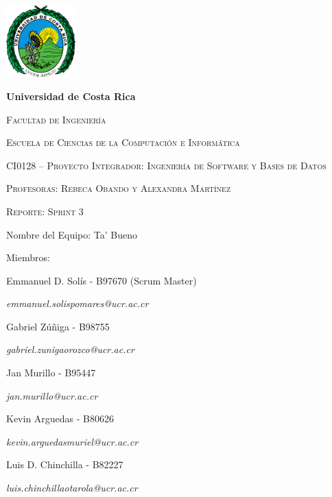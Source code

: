 \documentclass{article}
\begin{document}
\begin{titlepage}
\centering
{\includegraphics[width=0.2\textwidth]{logoUCR.png}\par}
\vspace{1cm}
{\bfseries\LARGE Universidad de Costa Rica \par}
\vspace{1cm}
{\scshape\Large Facultad de Ingenier\'ia \par}
{\scshape\Large Escuela de Ciencias de la Computaci\'on e Inform\'atica \par}
\vspace{1cm}
{\scshape\Large CI0128 – Proyecto Integrador: Ingeniería de Software y Bases de Datos \par}
{\scshape\Large Profesoras: Rebeca Obando y Alexandra Martínez \par}
\vspace{1cm}
{\scshape\Huge Reporte: Sprint 3 \par}
\vspace{1cm}
{\Large Nombre del Equipo: Ta' Bueno \par}
\vspace{0.5cm}
{\Large Miembros: \par}
{\Large Emmanuel D. Sol\'is - B97670 (Scrum Master)\par}
{\Large \textit{\color{blue}emmanuel.solispomares@ucr.ac.cr} \par}
{\Large Gabriel Zúñiga - B98755\par}
{\Large \textit{\color{blue}gabriel.zunigaorozco@ucr.ac.cr} \par}
{\Large Jan Murillo - B95447\par}
{\Large \textit{\color{blue}jan.murillo@ucr.ac.cr} \par}
{\Large Kevin Arguedas - B80626\par}
{\Large \textit{\color{blue}kevin.arguedasmuriel@ucr.ac.cr} \par}
{\Large Luis D. Chinchilla - B82227\par}
{\Large \textit{\color{blue}luis.chinchillaotarola@ucr.ac.cr} \par}
\end{titlepage}

\end{document}
